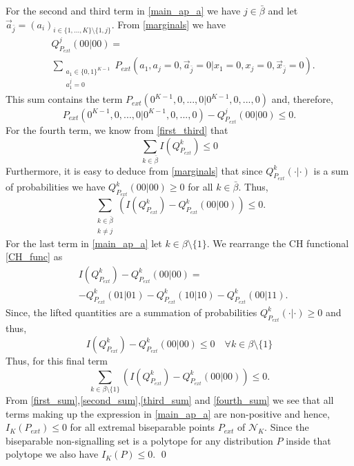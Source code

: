 \documentclass[pra,aps,reprint,superscriptaddress]{revtex4-2}
\theoremstyle{theorem}
\begin{document}
For the second and third term in \eqref{main_ap_a} we have $j\in \bar \beta$ and let $\vec a_{\bar j} = (a_i)_{i\in\{1,...,K\}\setminus \{1,j\}}$. From \eqref{marginals} we have
\begin{align}
&Q^j_{P_{ext}}(00|00) =\\& \sum_{\substack{a_1\in \{0,1\}^{K-1}\\a_1^j=0}}P_{ext}(a_1,a_j=0,\vec a_{\bar j}=0|x_1=0,x_j=0,\vec x_{\bar j}=0).\nonumber
\end{align}
This sum contains the term $P_{ext}(0^{K-1},0,...,0|0^{K-1},0,...,0)$ and, therefore,
\begin{equation}\label{second_sum}
    P_{ext}(0^{K-1},0,...,0|0^{K-1},0,...,0)-Q^j_{P_{ext}}(00|00)\leq 0.
\end{equation}
For the fourth term, we know from \eqref{first_third} that
\begin{equation}
    \sum_{k\in \bar\beta}I\left( Q^k_{P_{ext}}\right)\leq 0
\end{equation}
Furthermore, it is easy to deduce from \eqref{marginals} that since $Q^k_{P_{ext}}(\cdot|\cdot)$ is a sum of probabilities we have $Q^k_{P_{ext}}(00|00)\geq 0$ for all $k\in\bar \beta$. Thus,
\begin{equation}\label{third_sum}
    \sum_{\substack{k\in\bar \beta\\ k\neq j}}\left(I\left(Q^k_{P_{ext}}\right)-Q^k_{P_{ext}}(00|00)\right)\leq 0.
\end{equation}
For the last term in \eqref{main_ap_a} let $k\in \beta \setminus \{1\}$. We rearrange the CH functional \eqref{CH_func} as
\begin{align}
    &I\left(Q^k_{P_{ext}}\right)-Q^k_{P_{ext}}(00|00)=\\&
    -Q^k_{P_{ext}}(01|01)-Q^k_{P_{ext}}(10|10)-Q^k_{P_{ext}}(00|11).\nonumber
\end{align}
Since, the lifted quantities are a summation of probabilities $Q^k_{P_{ext}}(\cdot|\cdot)\geq 0$ and thus,
\begin{equation}
    I\left(Q^k_{P_{ext}}\right)-Q^k_{P_{ext}}(00|00)\leq 0 \quad \forall k\in \beta \setminus \{1\}
\end{equation}
Thus, for this final term
\begin{equation}\label{fourth_sum}
    \sum_{k\in\beta\setminus \{1\}}\left(I\left(Q^k_{P_{ext}}\right)-Q^k_{P_{ext}}(00|00)\right)\leq 0.
\end{equation}
From \eqref{first_sum},\eqref{second_sum},\eqref{third_sum} and \eqref{fourth_sum} we see that all terms making up the expression in \eqref{main_ap_a} are non-positive and hence, $I_K\left(P_{ext}\right)\leq 0$ for all extremal biseparable points $P_{ext}$ of $\mathcal{N}_K$. Since the biseparable non-signalling set is a polytope for any distribution $P$ inside that polytope we also have $I_K\left(P\right)\leq 0$. \qed
\end{document}
